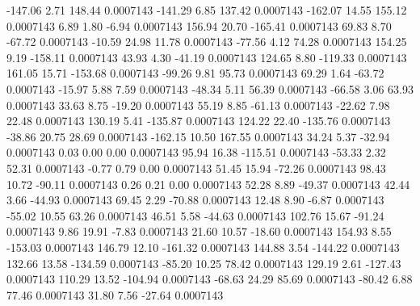      -147.06        2.71      148.44     0.0007143
     -141.29        6.85      137.42     0.0007143
     -162.07       14.55      155.12     0.0007143
        6.89        1.80       -6.94     0.0007143
      156.94       20.70     -165.41     0.0007143
       69.83        8.70      -67.72     0.0007143
      -10.59       24.98       11.78     0.0007143
      -77.56        4.12       74.28     0.0007143
      154.25        9.19     -158.11     0.0007143
       43.93        4.30      -41.19     0.0007143
      124.65        8.80     -119.33     0.0007143
      161.05       15.71     -153.68     0.0007143
      -99.26        9.81       95.73     0.0007143
       69.29        1.64      -63.72     0.0007143
      -15.97        5.88        7.59     0.0007143
      -48.34        5.11       56.39     0.0007143
      -66.58        3.06       63.93     0.0007143
       33.63        8.75      -19.20     0.0007143
       55.19        8.85      -61.13     0.0007143
      -22.62        7.98       22.48     0.0007143
      130.19        5.41     -135.87     0.0007143
      124.22       22.40     -135.76     0.0007143
      -38.86       20.75       28.69     0.0007143
     -162.15       10.50      167.55     0.0007143
       34.24        5.37      -32.94     0.0007143
        0.03        0.00        0.00     0.0007143
       95.94       16.38     -115.51     0.0007143
      -53.33        2.32       52.31     0.0007143
       -0.77        0.79        0.00     0.0007143
       51.45       15.94      -72.26     0.0007143
       98.43       10.72      -90.11     0.0007143
        0.26        0.21        0.00     0.0007143
       52.28        8.89      -49.37     0.0007143
       42.44        3.66      -44.93     0.0007143
       69.45        2.29      -70.88     0.0007143
       12.48        8.90       -6.87     0.0007143
      -55.02       10.55       63.26     0.0007143
       46.51        5.58      -44.63     0.0007143
      102.76       15.67      -91.24     0.0007143
        9.86       19.91       -7.83     0.0007143
       21.60       10.57      -18.60     0.0007143
      154.93        8.55     -153.03     0.0007143
      146.79       12.10     -161.32     0.0007143
      144.88        3.54     -144.22     0.0007143
      132.66       13.58     -134.59     0.0007143
      -85.20       10.25       78.42     0.0007143
      129.19        2.61     -127.43     0.0007143
      110.29       13.52     -104.94     0.0007143
      -68.63       24.29       85.69     0.0007143
      -80.42        6.88       77.46     0.0007143
       31.80        7.56      -27.64     0.0007143

